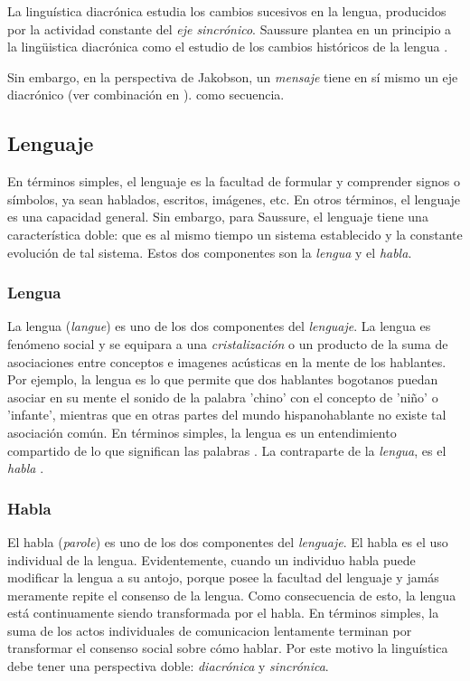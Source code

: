 \documentclass[12pt,letterpaper,twoside]{article}
\begin{document}
La linguística diacrónica estudia los cambios sucesivos en la
lengua, producidos por la actividad constante del \emph{eje
sincrónico}. Saussure plantea en un principio a la lingüistica
diacrónica como el estudio de los cambios históricos de la
lengua \cite{alonso1945curso}.


Sin embargo, en la perspectiva de Jakobson, un \emph{mensaje} tiene en
sí mismo un eje diacrónico (ver combinación en ).
como secuencia. 

\subsection{Lenguaje}
\label{sec:org773d98b}
En términos simples, el lenguaje es la facultad de formular y
comprender signos o símbolos, ya sean hablados, escritos,
imágenes, etc.  En otros términos, el lenguaje es una capacidad
general. Sin embargo, para Saussure, el lenguaje tiene una
característica doble: que es al mismo tiempo un sistema
establecido y la constante evolución de tal sistema. Estos dos
componentes son la \emph{lengua} y el \emph{habla}.

\subsubsection{Lengua}
\label{sec:orga577cf7}

La lengua (\emph{langue}) es uno de los dos componentes del
\emph{lenguaje}.  La lengua es fenómeno social y se equipara a una
\emph{cristalización} o un producto de la suma de asociaciones entre
conceptos e imagenes acústicas en la mente de los hablantes. Por
ejemplo, la lengua es lo que permite que dos hablantes bogotanos
puedan asociar en su mente el sonido de la palabra 'chino' con el
concepto de 'niño' o 'infante', mientras que en otras partes del
mundo hispanohablante no existe tal asociación común.  En
términos simples, la lengua es un entendimiento compartido de lo
que significan las palabras \cite[pg. 102]{alonso1945curso}. La
contraparte de la \emph{lengua}, es el \emph{habla} .

\subsubsection{Habla}
\label{sec:org25f67eb}
El habla (\emph{parole}) es uno de los dos componentes del
\emph{lenguaje}. El habla es el uso individual de la lengua.
Evidentemente, cuando un individuo habla puede modificar
la lengua a su antojo, porque posee la facultad del
lenguaje y jamás meramente repite el consenso de la lengua.
Como consecuencia de esto, la lengua está continuamente
siendo transformada por el habla. En términos simples,
la suma de los actos individuales de comunicacion lentamente
terminan por transformar el consenso social sobre cómo
hablar.  Por este motivo la linguística debe tener una
perspectiva doble: \emph{diacrónica} y \emph{sincrónica}.
\end{document}
